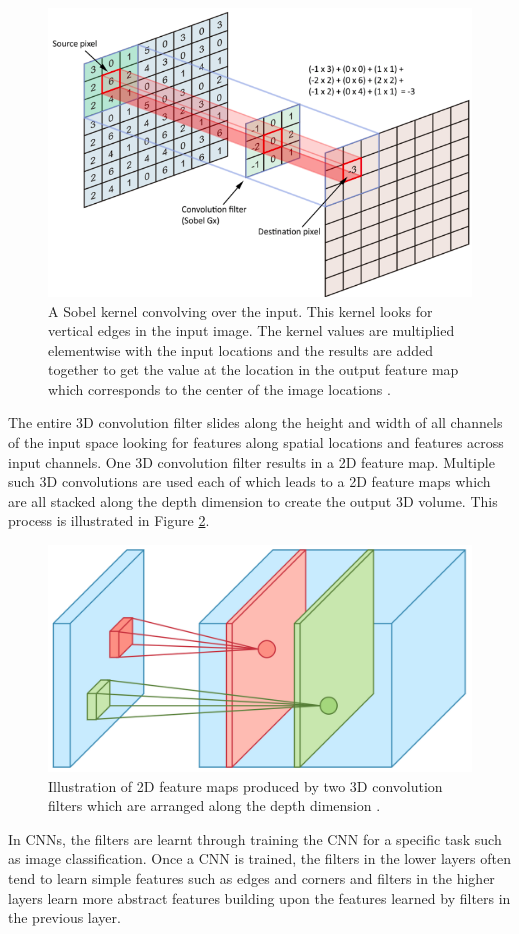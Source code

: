 	\begin{figure}[h]
		\centering
		\includegraphics[width=.8\linewidth]{images/convolution}
		\caption{A Sobel kernel convolving over the input. This kernel looks for vertical edges in the input image. The kernel values are multiplied elementwise with the input locations and the results are added together to get the value at the location in the output feature map which corresponds to the center of the image locations  \cite{freecodecamp}.}
		\label{Fig:convolution}
	\end{figure}
	
The entire 3D convolution filter slides along the height and width of all channels of the input space looking for features along spatial locations and features across input channels. One 3D convolution filter results in a 2D feature map. Multiple such 3D convolutions are used each of which leads to a 2D feature maps which are all stacked along the depth dimension to create the output 3D volume. This process is illustrated in Figure \ref{Fig:3dconv}.

	\begin{figure}[h]
		\centering
		\includegraphics[width=.3\linewidth]{images/3d_conv}
		\caption{Illustration of 2D feature maps produced by two 3D convolution filters which are arranged along the depth dimension  \cite{towardsdatascience}.}
		\label{Fig:3dconv}
	\end{figure}
	
In CNNs, the filters are learnt through training the CNN for a specific task such as image classification. Once a CNN is trained, the filters in the lower layers often tend to learn simple features such as edges and corners and filters in the higher layers learn more abstract features building upon the features learned by filters in the previous layer. 

